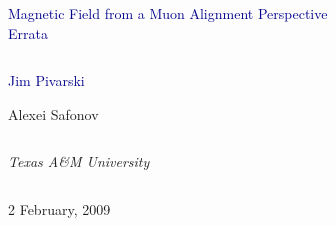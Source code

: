 \documentclass[compress]{beamer}
\begin{document}
\begin{frame}
\vfill
\begin{center}
\textcolor{darkblue}{\Large Magnetic Field from a Muon Alignment Perspective \\ \vspace{0.5 cm} \LARGE Errata}

\vfill
\begin{columns}
\begin{center}
\large
\textcolor{darkblue}{Jim Pivarski}

\vspace{0.2 cm}
Alexei Safonov
\end{center}
\end{columns}

\begin{columns}
\begin{center}
\scriptsize
{\it Texas A\&M University}
\end{center}
\end{columns}

\vfill
 2 February, 2009

\end{center}
\end{frame}


\small

\setcounter{page}{8}
\end{document}

